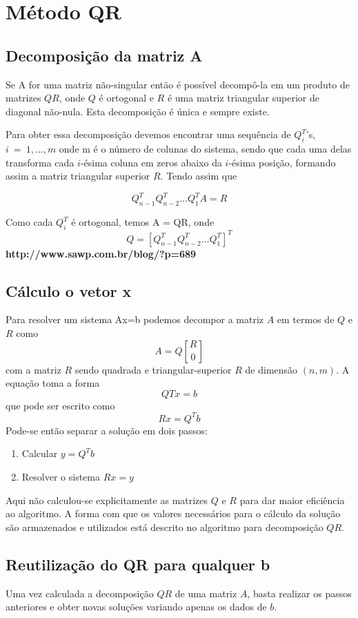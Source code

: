 \chapter{Método QR}

	\section{Decomposição da matriz A}
	Se A for uma matriz não-singular então é possível decompô-la em um produto de matrizes 
	$QR$, onde $Q$ é ortogonal e $R$ é uma matriz triangular superior de diagonal não-nula. Esta decomposição é única e sempre existe.
	
	Para obter essa decomposição devemos encontrar uma sequência de $Q_i ^T$'s, $i~ =~ 1,...,m$ onde m é o número de colunas do sistema, sendo que cada uma delas transforma cada $i$-ésima coluna em zeros abaixo da $i$-ésima posição, formando assim a matriz triangular superior $R$. Tendo assim que
	
	\[Q_{n-1} ^TQ_{n-2} ^T \ldots Q_{1} ^T A = R\]
	
	Como cada $Q_i ^T$ é ortogonal, temos A = QR, onde \[Q = [Q_{n-1} ^T Q_{n-2} ^T \ldots Q_{1} ^T]^T \]\textbf{http://www.sawp.com.br/blog/?p=689}%
	\section{Cálculo o vetor x}
	Para resolver um sistema Ax=b podemos decompor a matriz $A$ em termos de $Q$ e $R$ como \[ A = Q{R \brack 0}\] com a matriz $R$ sendo quadrada e triangular-superior $R$ de dimensão $(n,m)$.
	A equação toma a forma \[QTx = b\] que pode ser escrito como \[Rx=Q^Tb\]
	Pode-se então separar a solução em dois passos:
	\begin{enumerate}
	\item Calcular $y = Q^Tb$
	\item Resolver o sistema $Rx = y$
	\end{enumerate}
	
	Aqui não calculou-se explicitamente as matrizes $Q$ e $R$ para dar maior eficiência ao algoritmo. A forma com que os valores necessários para o cálculo da solução são armazenados e utilizados está descrito no algoritmo para decomposição $QR$.
	
	\section{Reutilização do QR para qualquer b}
	Uma vez calculada a decomposição $QR$ de uma matriz $A$, basta realizar os passos anteriores e obter novas soluções variando apenas os dados de $b$.

